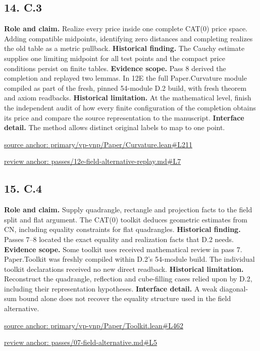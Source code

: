 \documentclass[11pt,letterpaper]{article}
\theoremstyle{definition}\newtheorem{definition}[theorem]{Definition}\newtheorem{example}[theorem]{Example}
\theoremstyle{remark}\newtheorem{remark}[theorem]{Remark}
\begin{document}
\subsection*{14. C.3}
\textbf{Role and claim.} Realize every price inside one complete CAT(0) price space. Adding compatible midpoints, identifying zero distances and completing realizes the old table as a metric pullback.
\textbf{Historical finding.} The Cauchy estimate supplies one limiting midpoint for all test points and the compact price conditions persist on finite tables.
\textbf{Evidence scope.} Pass 8 derived the completion and replayed two lemmas. In 12E the full Paper.Curvature module compiled as part of the fresh, pinned 54-module D.2 build, with fresh theorem and axiom readbacks.
\textbf{Historical limitation.} At the mathematical level, finish the independent audit of how every finite configuration of the completion obtains its price and compare the source representation to the manuscript.
\textbf{Interface detail.} The method allows distinct original labels to map to one point.
\par\href{https://github.com/nousentllc/VP-VNP-Review/blob/8a7976933b6b2b4ffda1ad3a0dfb5fc6b6f023e8/primary/vp-vnp/Paper/Curvature.lean\#L211}{source anchor: primary/vp-vnp/Paper/Curvature.lean\#L211}
\par\href{https://github.com/nousentllc/VP-VNP-Review/blob/8a7976933b6b2b4ffda1ad3a0dfb5fc6b6f023e8/passes/12e-field-alternative-replay.md\#L7}{review anchor: passes/12e-field-alternative-replay.md\#L7}
\goodbreak
{}
\hypertarget{claim.15}{}
\subsection*{15. C.4}
\textbf{Role and claim.} Supply quadrangle, rectangle and projection facts to the field split and flat argument. The CAT(0) toolkit deduces geometric estimates from CN, including equality constraints for flat quadrangles.
\textbf{Historical finding.} Passes 7–8 located the exact equality and realization facts that D.2 needs.
\textbf{Evidence scope.} Some toolkit uses received mathematical review in pass 7. Paper.Toolkit was freshly compiled within D.2's 54-module build. The individual toolkit declarations received no new direct readback.
\textbf{Historical limitation.} Reconstruct the quadrangle, reflection and cube-filling cases relied upon by D.2, including their representation hypotheses.
\textbf{Interface detail.} A weak diagonal-sum bound alone does not recover the equality structure used in the field alternative.
\par\href{https://github.com/nousentllc/VP-VNP-Review/blob/8a7976933b6b2b4ffda1ad3a0dfb5fc6b6f023e8/primary/vp-vnp/Paper/Toolkit.lean\#L462}{source anchor: primary/vp-vnp/Paper/Toolkit.lean\#L462}
\par\href{https://github.com/nousentllc/VP-VNP-Review/blob/8a7976933b6b2b4ffda1ad3a0dfb5fc6b6f023e8/passes/07-field-alternative.md\#L5}{review anchor: passes/07-field-alternative.md\#L5}
\goodbreak
{}
\hypertarget{claim.16}{}
\end{document}
